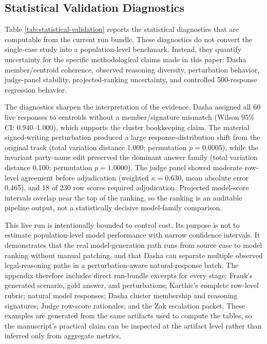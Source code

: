 \begin{table}[h]
\centering
\caption{Internal validation summary for the live natural-response batch.}
\label{tab:internal-validation}

\end{table}

\subsection{Statistical Validation Diagnostics}

Table \ref{tab:statistical-validation} reports the statistical diagnostics that
are computable from the current run bundle. These diagnostics do not convert the
single-case study into a population-level benchmark. Instead, they quantify
uncertainty for the specific methodological claims made in this paper: Dasha
member/centroid coherence, observed reasoning diversity, perturbation behavior,
judge-panel stability, projected-ranking uncertainty, and controlled
500-response regression behavior.

\begin{table}[t]
\centering
\caption{Statistical validation diagnostics for the live run and controlled regression.}
\label{tab:statistical-validation}

\end{table}

The diagnostics sharpen the interpretation of the evidence. Dasha assigned all
60 live responses to centroids without a member/signature mismatch
(Wilson 95\% CI: 0.940--1.000), which supports the cluster bookkeeping claim.
The material signed-writing perturbation produced a large response-distribution
shift from the original track (total variation distance 1.000; permutation
\(p=0.0005\)), while the invariant party-name edit preserved the dominant
answer family (total variation distance 0.100; permutation \(p=1.0000\)). The
judge panel showed moderate row-level agreement before adjudication
(weighted \(\kappa=0.630\), mean absolute error 0.465), and 18 of 230 row
scores required adjudication. Projected model-score intervals overlap near the
top of the ranking, so the ranking is an auditable pipeline output, not a
statistically decisive model-family comparison.

This live run is intentionally bounded to control cost. Its purpose is not to
estimate population-level model performance with narrow confidence intervals.
It demonstrates that the real model-generation path runs from source case to
model ranking without manual patching, and that Dasha can separate multiple
observed legal-reasoning paths in a perturbation-aware natural-response batch.
The appendix therefore includes direct run-bundle excerpts for every stage:
Frank's generated scenario, gold answer, and perturbations; Karthic's complete
row-level rubric; natural model responses; Dasha cluster membership and
reasoning signatures; Judge row-score rationales; and the Zak escalation packet.
These examples are generated from the same artifacts used to compute the tables,
so the manuscript's practical claim can be inspected at the artifact level
rather than inferred only from aggregate metrics.

